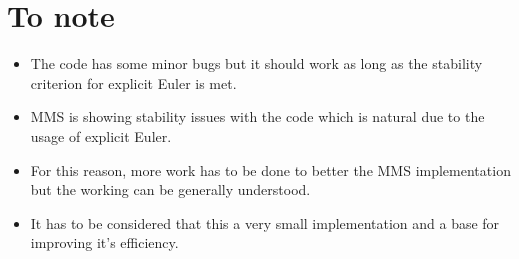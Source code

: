 \section{To note}

\begin{itemize}
  \item The code has some minor bugs but it should work as long as the stability criterion for explicit Euler is met.
  \item MMS is showing stability issues with the code which is natural due to the usage of explicit Euler. 
  \item For this reason, more work has to be done to better the MMS implementation but the working can be generally understood.
  \item It has to be considered that this a very small implementation and a base for improving it's efficiency. 
  
  
\end{itemize}

